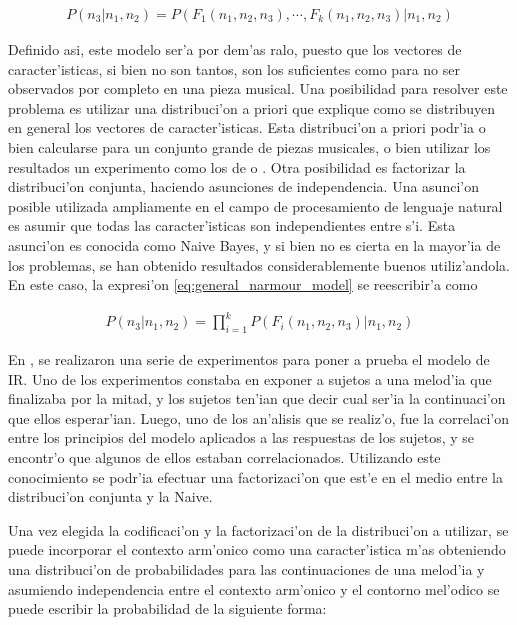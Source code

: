 \begin{align}
\label{eq:general_narmour_model}
P(n_3 | n_1, n_2) = P(F_1(n_1, n_2, n_3), \cdots, F_k(n_1, n_2, n_3)|n_1, n_2)
\end{align}

Definido asi, este modelo ser'a por dem'as ralo, puesto que los vectores de caracter'isticas, si bien no son tantos, son los suficientes como para no ser observados
por completo en una pieza musical. Una posibilidad para resolver este problema es utilizar una distribuci'on a priori que explique como se distribuyen en general
los vectores de caracter'isticas. Esta distribuci'on a priori podr'ia o bien calcularse para un conjunto grande de piezas musicales, o bien utilizar los resultados 
un experimento como los de \cite{Krumhansl95} o \cite{Schellenberg96}. 
Otra posibilidad es factorizar la distribuci'on conjunta, haciendo asunciones de independencia. Una asunci'on posible utilizada ampliamente en el campo 
de procesamiento de lenguaje natural es asumir que todas las caracter'isticas son independientes entre s'i. Esta asunci'on es conocida como Naive Bayes, y
si bien no es cierta en la mayor'ia de los problemas, se han obtenido resultados considerablemente buenos utiliz'andola. 
En este caso, la expresi'on \ref{eq:general_narmour_model} se reescribir'a como

\begin{align}
P(n_3 | n_1, n_2) = \prod_{i=1}^k P(F_i(n_1, n_2, n_3)|n_1, n_2)
\end{align}

En \cite{Schellenberg96}, se realizaron una serie de experimentos para poner a prueba el modelo de IR. Uno de los experimentos constaba en exponer a 
sujetos a una melod'ia que finalizaba por la mitad, y los sujetos ten'ian que decir cual ser'ia la continuaci'on que ellos esperar'ian. 
Luego, uno de los an'alisis que se realiz'o, fue la correlaci'on entre los principios del modelo aplicados a las respuestas de los sujetos, 
y se encontr'o que algunos de ellos estaban correlacionados. Utilizando este conocimiento se podr'ia efectuar una factorizaci'on que est'e en el medio entre 
la distribuci'on conjunta y la Naive.

Una vez elegida la codificaci'on y la factorizaci'on de la distribuci'on a utilizar, se puede incorporar el contexto arm'onico como una caracter'istica m'as 
obteniendo una distribuci'on de probabilidades para las continuaciones de una melod'ia y asumiendo independencia entre el contexto arm'onico y el contorno mel'odico
se puede escribir la probabilidad de la siguiente forma:

